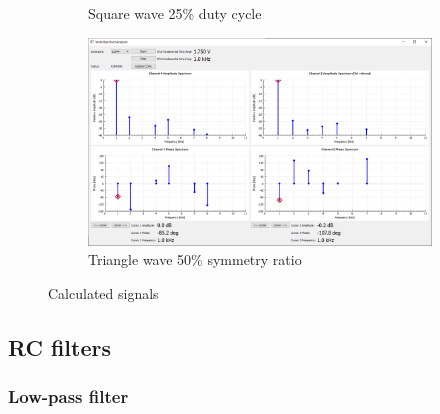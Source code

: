 \documentclass[notitlepage, a4paper, 11pt]{article}
\begin{document}
\begin{figure}[H]
\begin{subfigure}[][][t]{0.23\textwidth}
			\caption{Square wave 25\% duty cycle}
		\end{subfigure}
		\hfill
		\begin{subfigure}[][][t]{0.23\textwidth}
			\includegraphics[width=\textwidth]{../img/Circuit1/trig50}
			\caption{Triangle wave 50\% symmetry ratio}
		\end{subfigure}
		\caption{Calculated signals}
		\label{fig:pure-signals}
	\end{figure}
	
	\subsection{RC filters}
	\subsubsection{Low-pass filter}
	
\end{document}

